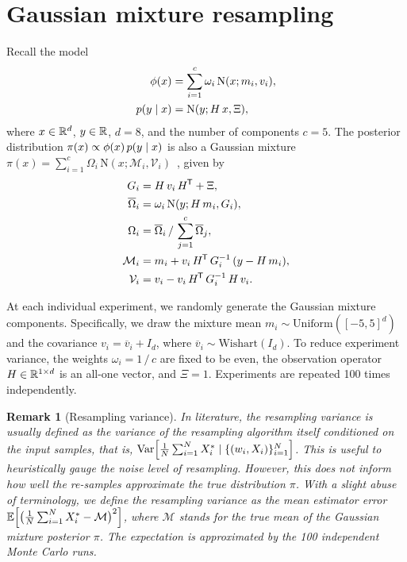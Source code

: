 \documentclass{article}
\newtheorem{remark}{Remark}
\begin{document}
\section{Gaussian mixture resampling}
\label{app:exp-gm}
Recall the model
%
\begin{equation}
    \begin{split}
        \phi(x) &= \sum_{i=1}^c \omega_i \, \mathrm{N}(x; m_i, v_i), \\
        p(y {\;|\;} x) &= \mathrm{N}(y; H \, x, \Xi),
    \end{split}
\end{equation}
%
where $x\in\mathbb{R}^d$, $y \in\mathbb{R}$, $d=8$, and the number of components $c=5$. 
The posterior distribution $\pi(x) \propto \phi(x) \, p(y {\;|\;} x)$ is also a Gaussian mixture $\pi(x) = \sum_{i=1}^c \Omega_i \, \mathrm{N}(x; \mathcal{M}_i, \mathcal{V}_i)$~\citep{Zhao2025B0SMC}, given by 
%
\begin{equation*}
    \begin{split}
        G_i &= H \, v_i \, H^{\mkern-1.5mu\mathsf{T}} + \Xi, \\
        \overline{\Omega}_i &= \omega_i \, \mathrm{N}(y; H \, m_i, G_i), \\
        \Omega_i &= \overline{\Omega}_i \, / \, \sum_{j=1}^c \overline{\Omega}_j, \\
        \mathcal{M}_i &= m_i + v_i \, H^{\mkern-1.5mu\mathsf{T}}  \, G^{-1}_i \, (y - H \, m_i), \\
        \mathcal{V}_i &= v_i - v_i \, H^{\mkern-1.5mu\mathsf{T}} \, G^{-1}_i \, H \, v_i.
    \end{split}
\end{equation*}
%

At each individual experiment, we randomly generate the Gaussian mixture components. 
Specifically, we draw the mixture mean $m_i \sim \mathrm{Uniform}([-5, 5]^d)$ and the covariance $v_i = \overline{v}_i + I_d$, where $\overline{v}_i \sim \mathrm{Wishart}(I_d)$.
To reduce experiment variance, the weights $\omega_i = 1 \, / \, c$ are fixed to be even, the observation operator $H\in\mathbb{R}^{1 \times d}$ is an all-one vector, and $\Xi=1$.
Experiments are repeated 100 times independently.

\begin{remark}[Resampling variance]
    In literature, the resampling variance is usually defined as the variance of the resampling algorithm itself conditioned on the input samples, that is, $\operatorname{Var} \Bigl[ \frac{1}{N}\sum_{i=1}^N X_i^* {\;|\;} \lbrace (w_i, X_i) \rbrace_{i=1}^N \Bigr]$. 
    This is useful to heuristically gauge the noise level of resampling. 
    However, this does not inform how well the re-samples approximate the true distribution $\pi$. 
    With a slight abuse of terminology, we define the resampling variance as the mean estimator error $\operatorname{\mathbb{E}} \Bigl[ \bigl(\frac{1}{N}\sum_{i=1}^N X_i^* - \mathcal{M} \bigr)^2 \Bigr]$, where $\mathcal{M}$ stands for the true mean of the Gaussian mixture posterior $\pi$.
    The expectation is approximated by the 100 independent Monte Carlo runs.
\end{remark}
\end{document}

